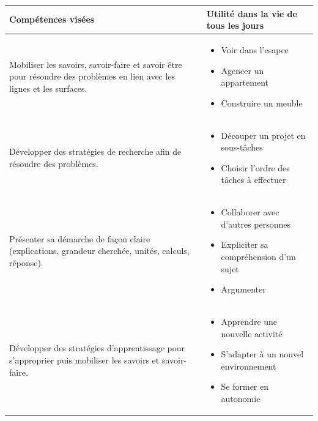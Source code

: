 \def\arraystretch{1.6}
\begin{tabularx}{\textwidth}{|>{\raggedright\arraybackslash}X|>{\raggedright\arraybackslash}X|}
\hline
\cellcolor{themeColor!30}Compétences visées & \cellcolor{themeColor!30}Utilité dans la vie de tous les jours \\
\hline
Mobiliser les savoirs, savoir-faire et savoir être pour résoudre des problèmes en lien avec les lignes et les surfaces.
&\vspace{-1em}
\begin{itemize}[leftmargin=*, itemsep=2pt, topsep=0pt, partopsep=0pt, parsep=0pt, label=$\triangleright$]
    \item Voir dans l'esapce
    \item Agencer un appartement
    \item Construire un meuble
\end{itemize} \\
\hline

Développer des stratégies de recherche afin de résoudre des problèmes.
&\vspace{-1em}
\begin{itemize}[leftmargin=*, itemsep=2pt, topsep=0pt, label=$\triangleright$]
    \item Découper un projet en sous-tâches
    \item Choisir l'ordre des tâches à effectuer
\end{itemize} \\
\hline

Présenter sa démarche de façon claire (explications, grandeur cherchée, unités, calculs, réponse).
&\vspace{-1em}
\begin{itemize}[leftmargin=*, itemsep=2pt, topsep=0pt, label=$\triangleright$]
    \item Collaborer avec d'autres personnes
    \item Expliciter sa compréhension d'un sujet
    \item Argumenter
\end{itemize} \\
\hline

Développer des stratégies d'apprentissage pour s'approprier puis mobiliser les savoirs et savoir-faire.
&\vspace{-1em}
\begin{itemize}[leftmargin=*, itemsep=2pt, topsep=0pt, label=$\triangleright$]
    \item Apprendre une nouvelle activité %
    \item S'adapter à un nouvel environnement %
    \item Se former en autonomie %
\end{itemize} \\
\hline


\end{tabularx}
